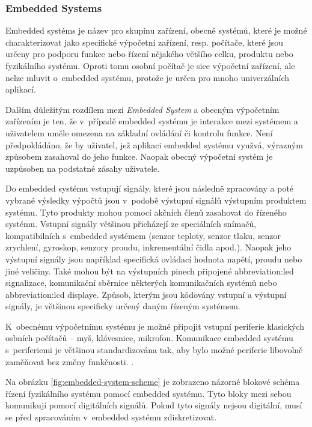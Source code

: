 \documentclass[a4paper, twoside, 11pt]{article}
\begin{document}
	\subsubsection{Embedded Systems}
	Embedded systéms je název pro skupinu zařízení, obecně systémů, které je možné charakterizovat jako specifické výpočetní zařízení, resp. počítače, které jsou určeny pro podporu funkce nebo řízení nějakého většího celku, produktu nebo fyzikálního systému. Oproti tomu osobní počítač je sice výpočetní zařízení, ale nelze mluvit o~embedded systému, protože je určen pro mnoho univerzálních aplikací. \cite{Sass2010}\par
	Dalším důležitým rozdílem mezi \textit{Embedded System} a obecným výpočetním zařízením je ten, že v~případě embedded systému je interakce mezi systémem a uživatelem uměle omezena na základní ovládání či kontrolu funkce. Není předpokládáno, že by uživatel, jež aplikaci embedded systému využvá, výrazným způsobem zasahoval do jeho funkce. Naopak obecný výpočetní systém je uzpůsoben na podstatné zásahy uživatele. \cite{Sass2010} \cite{juan-fpgas}\par
	Do embedded systému vstupují signály, které jsou následně zpracovány a poté vybrané výsledky výpočtů jsou v~podobě výstupní signálů výstupním produktem systému. Tyto produkty mohou pomocí akčních členů zasahovat do řízeného systému. Vstupní signály většinou přicházejí ze speciálních snímačů, kompatibilních s~embedded systémem (senzor teploty, senzor tlaku, senzor zrychlení, gyroskop, senzory proudu, inkrementální čidla apod.). Naopak jeho výstupní signály jsou například specifická ovládací hodnota napětí, proudu nebo jiné veličiny. Také mohou být na výstupních pinech připojené \gls{abbreviation:led} signalizace, komunikační sběrnice některých komunikačních systémů nebo \gls{abbreviation:lcd} displaye. Způsob, kterým jsou kódovány vstupní a výstupní signály, je většinou specificky určený daným řízeným systémem. \cite{Sass2010}\par
	K~obecnému výpočetnímu systému je možné připojit vstupní periferie klasických osbních počítačů – myš, klávesnice, mikrofon. Komunikace embedded systému s~periferiemi je většinou standardizována tak, aby bylo možné periferie libovolně zaměňovat bez změny funkčnosti. \cite{Sass2010}.\par
	Na obrázku \ref{fig:embedded-system-scheme} je zobrazeno názorné blokové schéma řízení fyzikálního systému pomocí embedded systému. Tyto bloky mezi sebou komunikují pomocí digitálních signálů. Pokud tyto signály nejsou digitální, musí se před zpracováním v~embedded systému zdiskretizovat.
\end{document}

